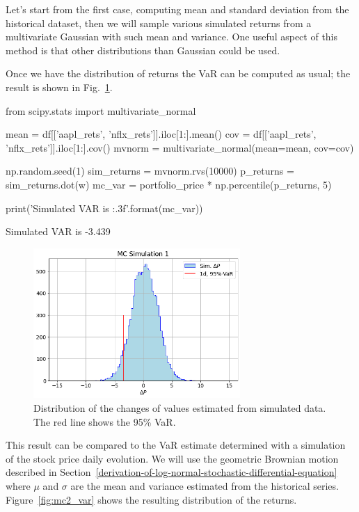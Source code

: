 Let's start from the first case, computing mean and standard deviation from the historical dataset, then we will sample various simulated returns from a multivariate Gaussian with such mean and variance. One useful aspect of this method is that other distributions than Gaussian could be used. 

Once we have the distribution of returns the VaR can be computed as usual; the result is shown in Fig.~\ref{fig:mc1_var}.

\begin{ipython}
from scipy.stats import multivariate_normal

mean = df[['aapl_rets', 'nflx_rets']].iloc[1:].mean()
cov = df[['aapl_rets', 'nflx_rets']].iloc[1:].cov()
mvnorm = multivariate_normal(mean=mean, cov=cov)

np.random.seed(1)
sim_returns = mvnorm.rvs(10000)
p_returns = sim_returns.dot(w)
mc_var = portfolio_price * np.percentile(p_returns, 5)

print('Simulated VAR is {:.3f}'.format(mc_var))
\end{ipython}
\begin{ioutput}
Simulated VAR is -3.439
\end{ioutput}

\begin{figure}[htb]
\centering
\includegraphics[width=0.7\textwidth]{figures/sim1_var}
\caption{Distribution of the changes of values estimated from simulated data. The red line shows the 95\% VaR.}
\label{fig:mc1_var}
\end{figure}

This result can be compared to the VaR estimate determined with a simulation of the stock price daily evolution. We will use the geometric Brownian motion described in Section~\ref{derivation-of-log-normal-stochastic-differential-equation} where $\mu$ and $\sigma$ are the mean and variance estimated from the historical series. Figure~\ref{fig:mc2_var} shows the resulting distribution of the returns.

